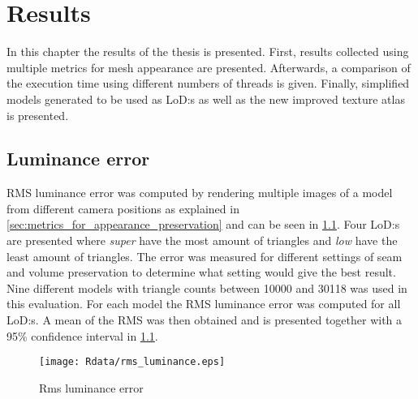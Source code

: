 \iffalse

\begin{figure}[ht]
  \centering
  \begin{subfigure}[b]{\textwidth}
    \centering
    \texttt{[image: ]}
    \caption{}
    \label{}
  \end{subfigure}
  \caption{}
  \label
\end{figure}

\fi



\chapter{Results} \label{cha:results}
In this chapter the results of the thesis is presented. First, results collected using multiple metrics for mesh appearance are presented. Afterwards, a comparison of the execution time using different numbers of threads is given. Finally, simplified models generated to be used as LoD:s as well as the new improved texture atlas is presented.

\section{Luminance error}

RMS luminance error was computed by rendering multiple images of a model from different camera positions as explained in \cref{sec:metrics_for_appearance_preservation} and can be seen in \cref{fig:mean_luminance_error}. Four LoD:s are presented where \emph{super} have the most amount of triangles and \emph{low} have the least amount of triangles. The error was measured for different settings of seam and volume preservation to determine what setting would give the best result. Nine different models with triangle counts between 10000 and 30118 was used in this evaluation. For each model the RMS luminance error was computed for all LoD:s. A mean of the RMS was then obtained and is presented together with a 95\% confidence interval in \cref{fig:mean_luminance_error}.

\begin{figure}[h]
  \centering
  \texttt{[image: Rdata/rms\_luminance.eps]}
  \caption{Rms luminance error}
  \label{fig:mean_luminance_error}
\end{figure}

\clearpage

